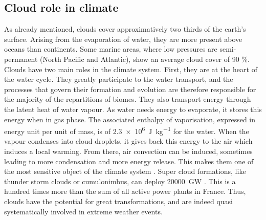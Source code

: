     \subsection{Cloud role in climate}
    \label{sec:cloud_role}
    As already mentioned, clouds cover approximatively two thirds of the earth's surface. Arising from the evaporation of water, they are more present above oceans than continents. Some marine areas, where low pressures are semi-permanent (North Pacific and Atlantic), show an average cloud cover of 90 \%.
    Clouds have two main roles in the climate system. 
    First, they are at the heart of the water cycle. They greatly participate to the water transport, and the processes that govern their formation and evolution are therefore responsible for the majority of the repartitions of biomes.
    They also transport energy through the latent heat of water vapour. As water needs energy to evaporate, it stores this energy when in gas phase. The associated enthalpy of vaporisation, expressed in energy unit per unit of mass, is of \SI{2.3e6}{\joule\per\kilogram} for the water. 
    When the vapour condenses into cloud droplets, it gives back this energy to the air which induces a local warming. From there, air convection can be induced, sometimes leading to more condensation and more energy release.
    This makes them one of the most sensitive object of the climate system \citep{bony_clouds_2015}.
    Super cloud formations, like thunder storm clouds or cumulonimbus, can deploy \SI{20000}{GW} \citep{chalon_combien_2014}. This is a hundred times more than the sum of all active power plants in France. Thus, clouds have the potential for great transformations, and are indeed quasi systematically involved in extreme weather events.


